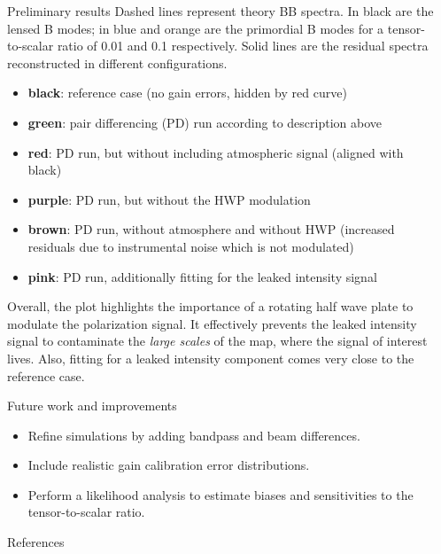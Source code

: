 \documentclass[final]{beamer}
\newlength{\sepwidth}
\newlength{\colwidth}
\newcommand{\separatorcolumn}{\begin{column}{\sepwidth}\end{column}}
\begin{document}
\begin{frame}[t]
\begin{columns}[t]
\begin{column}{\colwidth}
\begin{block}{Preliminary results}
        Dashed lines represent theory BB spectra.
        In black are the lensed B modes; in blue and orange are the primordial B modes for a tensor-to-scalar ratio of 0.01 and 0.1 respectively.
        Solid lines are the residual spectra reconstructed in different configurations.
        \begin{itemize}
          \item \textbf{black}: reference case (no gain errors, hidden by red curve)
          \item {\color{Green} \textbf{green}}: pair differencing (PD) run according to description above
          \item {\color{Red} \textbf{red}}: PD run, but without including atmospheric signal (aligned with black)
          \item {\color{Purple} \textbf{purple}}: PD run, but without the HWP modulation
          \item {\color{Sepia} \textbf{brown}}: PD run, without atmosphere and without HWP (increased residuals due to instrumental noise which is not modulated)
          \item {\color{VioletRed} \textbf{pink}}: PD run, additionally fitting for the leaked intensity signal
        \end{itemize}

        Overall, the plot highlights the importance of a rotating half wave plate to modulate the polarization signal.
        It effectively prevents the leaked intensity signal to contaminate the \emph{large scales} of the map, where the signal of interest lives.
        Also, fitting for a leaked intensity component comes very close to the reference case.

      \end{block}

      \begin{block}{Future work and improvements}

        \begin{itemize}
          \item Refine simulations by adding bandpass and beam differences.
          \item Include realistic gain calibration error distributions.
          \item Perform a likelihood analysis to estimate biases and sensitivities to the tensor-to-scalar ratio.
        \end{itemize}

      \end{block}

      \begin{block}{References}

        \nocite{*}
        \printbibliography

      \end{block}

    \end{column}

    \separatorcolumn
  \end{columns}
\end{frame}
\end{document}
